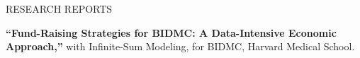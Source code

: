 \documentclass{resume} %
\begin{document}

 \begin{rSection}{RESEARCH REPORTS}

\textbf{``Fund-Raising Strategies for BIDMC: A Data-Intensive Economic Approach,''} with Infinite-Sum Modeling, for BIDMC, Harvard Medical School.


\end{rSection}

\end{document}
